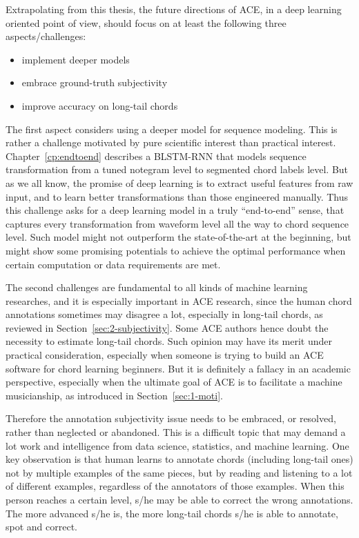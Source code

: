 
Extrapolating from this thesis, the future directions of ACE, in a deep learning oriented point of view, should focus on at least the following three aspects/challenges:
\begin{itemize}
\item implement deeper models
\item embrace ground-truth subjectivity
\item improve accuracy on long-tail chords
\end{itemize}

The first aspect considers using a deeper model for sequence modeling. This is rather a challenge motivated by pure scientific interest than practical interest. Chapter~\ref{cp:endtoend} describes a BLSTM-RNN that models sequence transformation from a tuned notegram level to segmented chord labels level. But as we all know, the promise of deep learning is to extract useful features from raw input, and to learn better transformations than those engineered manually. Thus this challenge asks for a deep learning model in a truly ``end-to-end'' sense, that captures every transformation from waveform level all the way to chord sequence level. Such model might not outperform the state-of-the-art at the beginning, but might show some promising potentials to achieve the optimal performance when certain computation or data requirements are met.

The second challenges are fundamental to all kinds of machine learning researches, and it is especially important in ACE research, since the human chord annotations sometimes may disagree a lot, especially in long-tail chords, as reviewed in Section~\ref{sec:2-subjectivity}. Some ACE authors hence doubt the necessity to estimate long-tail chords. Such opinion may have its merit under practical consideration, especially when someone is trying to build an ACE software for chord learning beginners. But it is definitely a fallacy in an academic perspective, especially when the ultimate goal of ACE is to facilitate a machine musicianship, as introduced in Section~\ref{sec:1-moti}.

Therefore the annotation subjectivity issue needs to be embraced, or resolved, rather than neglected or abandoned. This is a difficult topic that may demand a lot work and intelligence from data science, statistics, and machine learning. One key observation is that human learns to annotate chords (including long-tail ones) not by multiple examples of the same pieces, but by reading and listening to a lot of different examples, regardless of the annotators of those examples. When this person reaches a certain level, s/he may be able to correct the wrong annotations. The more advanced s/he is, the more long-tail chords s/he is able to annotate, spot and correct.

